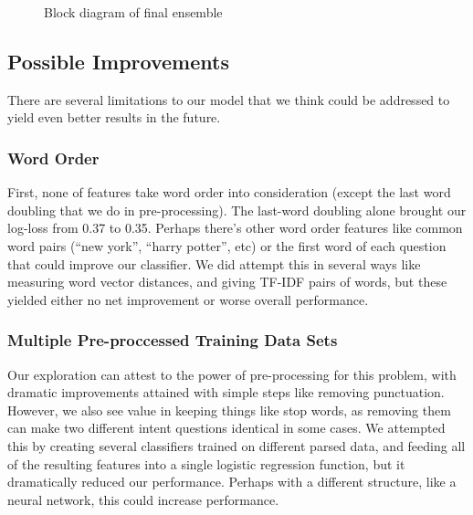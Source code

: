 \documentclass{article}
\begin{document}
\begin{figure}[h]
    \centering  
    \caption{Block diagram of final ensemble}
\end{figure}

\subsection{Possible Improvements}
There are several limitations to our model that we think could be addressed to yield even better results in the future.

\subsubsection{Word Order} First, none of features take word order into
consideration (except the last word doubling that we do in pre-processing). The
last-word doubling alone brought our log-loss from 0.37 to 0.35. Perhaps there’s
other word order features like common word pairs (“new york”, “harry potter”,
etc) or the first word of each question that could improve our classifier. We
did attempt this in several ways like measuring word vector distances, and
giving TF-IDF pairs of words, but these yielded either no net improvement or
worse overall performance.

\subsubsection{Multiple Pre-proccessed Training Data Sets}

Our exploration can attest to the power of pre-processing for this problem, with
dramatic improvements attained with simple steps like removing punctuation.
However, we also see value in keeping things like stop words, as removing them
can make two different intent questions identical in some cases. We attempted
this by creating several classifiers trained on different parsed data, and
feeding all of the resulting features into a single logistic regression
function, but it dramatically reduced our performance. Perhaps with a different
structure, like a neural network, this could increase performance.
\end{document}
